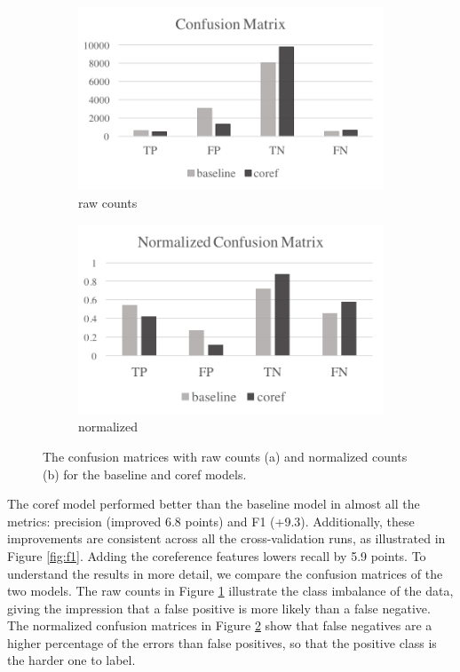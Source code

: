 \begin{figure}
\centering
\begin{subfigure}{.5\textwidth}
  \centering
  \includegraphics[width=1\linewidth]{plots/longer1_confusion_matrix_bar_chart.png}
  \caption{raw counts}
  \label{fig:conf_matrix_unnormalized}
\end{subfigure}%
\begin{subfigure}{.5\textwidth}
  \centering
  \includegraphics[width=1\linewidth]{plots/longer1_confusion_matrix_norm_bar_chart.png}
  \caption{normalized}
  \label{fig:conf_matrix_normalized}
\end{subfigure}
\caption{The confusion matrices with raw counts (a) and normalized counts (b) for the baseline and coref models.}
\label{fig:conf_matrix}
\end{figure}

The coref model performed better than the baseline model in almost all the metrics: precision (improved 6.8 points) and F1 (+9.3). Additionally, these improvements are consistent across all the cross-validation runs, as illustrated in Figure \ref{fig:f1}. Adding the coreference features lowers recall by 5.9 points. To understand the results in more detail, we compare the confusion matrices of the two models. The raw counts in Figure \ref{fig:conf_matrix_unnormalized} illustrate the class imbalance of the data, giving the impression that a false positive is more likely than a false negative. The normalized confusion matrices in Figure \ref{fig:conf_matrix_normalized} show that false negatives are a higher percentage of the errors than false positives, so that the positive class is the harder one to label. 

